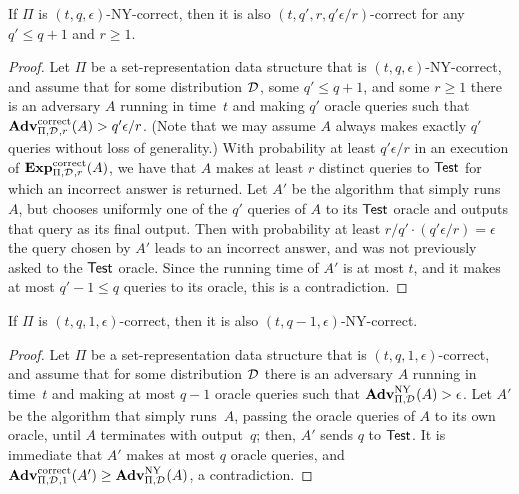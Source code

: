 \begin{theorem}
If $\Pi$ is $(t,q,\epsilon)$-NY-correct, then it is also
$(t, q', r, q'\epsilon/r)$-correct for any $q' \leq q+1$ and $r\geq
1$.
 
\end{theorem}
\begin{proof}
Let $\Pi$ be a set-representation data structure that is $(t,q,\epsilon)$-NY-correct,
and assume that for some distribution $\mathcal{D}_{}^{}$, some $q' \leq q+1$, and
some $r \geq 1$
there is an adversary $A$ running in time~$t$
and making $q'$ oracle queries such that
$\mathrm{\mathbf{Adv}}^{\mathrm{correct}}_{\Pi,\mathcal{D}_{}^{},r}(A) > q'\epsilon/r$.
(Note that
we may assume $A$ always makes exactly $q'$ queries without loss of generality.)
With probability at least
$q'\epsilon/r$ in an execution of $\mathrm{\mathbf{Exp}}^{\mathrm{correct}}_{\Pi,\mathcal{D}_{}^{},r}(A)$, we have that
$A$ makes at least $r$ distinct queries to $\mathsf{Test}$ for which
an incorrect answer is returned. Let $A'$ be the algorithm that simply
runs~$A$, but chooses
uniformly one of the $q'$ queries of $A$ to its $\mathsf{Test}$ oracle and outputs that query
as its final output. Then with probability at least $r/q' \cdot (q'\epsilon/r)=\epsilon$
the query chosen by $A'$
leads to an incorrect answer, and was not previously asked to the $\mathsf{Test}$ oracle.
Since the running time of $A'$ is at most $t$, and it makes at most $q'-1 \leq q$ queries
to its oracle, this is a contradiction.
\end{proof}


\begin{theorem}
If $\Pi$ is $(t, q, 1, \epsilon)$-correct, then it is also $(t, q-1, \epsilon)$-NY-correct.
\end{theorem}

\begin{proof}
Let $\Pi$ be a set-representation data structure that is $(t,q,1,\epsilon)$-correct,
and assume that for some distribution $\mathcal{D}_{}^{}$
there is an adversary $A$ running in time~$t$
and making at most $q-1$ oracle queries such that
$\mathrm{\mathbf{Adv}}^{\mathrm{NY}}_{\Pi,\mathcal{D}_{}^{}}(A) > \epsilon$.
Let $A'$ be the algorithm that simply
runs~$A$, passing the oracle queries of $A$ to its own oracle, until $A$ terminates
with output~$q$; then, $A'$ sends $q$ to $\mathsf{Test}$.  It is immediate that $A'$ makes at most $q$ oracle queries, and
$\mathrm{\mathbf{Adv}}^{\mathrm{correct}}_{\Pi,\mathcal{D}_{}^{},1}(A') \geq \mathrm{\mathbf{Adv}}^{\mathrm{NY}}_{\Pi,\mathcal{D}_{}^{}}(A)$, a contradiction.
\end{proof}

